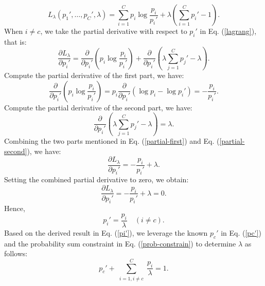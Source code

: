 \documentclass[10pt,journal]{IEEEtran}
\let\oldsum\sum
\renewcommand{\sum}{\displaystyle\oldsum}
\begin{document}
\begin{equation}
    L_\lambda(p_1', \dots, p_C', \lambda) = \sum_{i=1}^C p_i \log \frac{p_i}{p_i'} + \lambda \left(\sum_{i=1}^C p_i' - 1\right).
    \label{lagrang}
\end{equation}
When $i\neq c$, we take the partial derivative with respect to $p_i'$ in Eq. (\ref{lagrang}), that is:
\begin{equation}
    \frac{\partial L_\lambda}{\partial p_i'} = \frac{\partial}{\partial p_i'} \left( p_i \log \frac{p_i}{p_i'} \right) + \frac{\partial}{\partial p_i'} \left( \lambda \sum_{j=1}^C p_j' - \lambda \right).
\end{equation}
Compute the partial derivative of the first part, we have:
\begin{equation}
    \frac{\partial}{\partial p_i'} \left( p_i \log \frac{p_i}{p_i'} \right) = p_i \frac{\partial}{\partial p_i'} \left( \log p_i - \log p_i' \right) = -\frac{p_i}{p_i'}.
    \label{partial-first}
\end{equation}
Compute the partial derivative of the second part, we have:
\begin{equation}
    \frac{\partial}{\partial p_i'} \left( \lambda \sum_{j=1}^C p_j' - \lambda \right) = \lambda.
    \label{partial-second}
\end{equation}
Combining the two parts mentioned in Eq. (\ref{partial-first}) and Eq. (\ref{partial-second}), we have:
\begin{equation}
    \frac{\partial L_\lambda}{\partial p_i'} = -\frac{p_i}{p_i'} + \lambda.
\end{equation}
Setting the combined partial derivative to zero, we obtain:
\begin{equation}
    \frac{\partial L_\lambda}{\partial p_i'} = -\frac{p_i}{p_i'} + \lambda = 0.
\end{equation}
Hence,
\begin{equation}
    p_i' = \frac{p_i}{\lambda} \quad  (i\neq c).
    \label{pi'}
\end{equation}
Based on the derived result in Eq. (\ref{pi'}), we leverage the known $p_c'$ in Eq. (\ref{pc'}) and the probability sum constraint in Eq. (\ref{prob-constrain}) to determine $\lambda$ as follows:
\begin{equation}
    p_c' + \sum_{\substack{i = 1, i \neq c}}^{C} \frac{p_i}{\lambda} = 1.
\end{equation}
\end{document}
